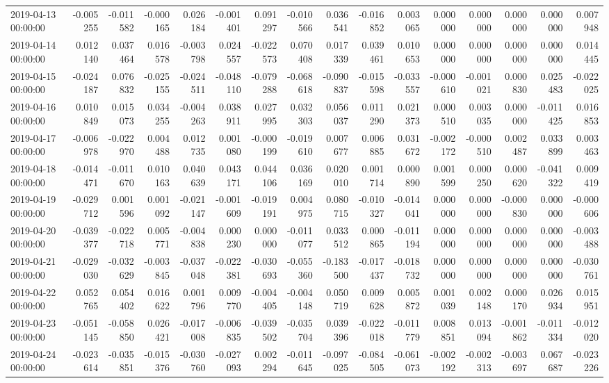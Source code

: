 \begin{tabular}{lrrrrrrrrrrrrrrr}
2019-04-13 00:00:00 & -0.005255 & -0.011582 & -0.000165 & 0.026184 & -0.001401 & 0.091297 & -0.010566 & 0.036541 & -0.016852 & 0.003065 & 0.000000 & 0.000000 & 0.000000 & 0.000000 & 0.007948 \\
2019-04-14 00:00:00 & 0.012140 & 0.037464 & 0.016578 & -0.003798 & 0.024557 & -0.022573 & 0.070408 & 0.017339 & 0.039461 & 0.010653 & 0.000000 & 0.000000 & 0.000000 & 0.000000 & 0.014445 \\
2019-04-15 00:00:00 & -0.024187 & 0.076832 & -0.025155 & -0.024511 & -0.048110 & -0.079288 & -0.068618 & -0.090837 & -0.015598 & -0.033557 & -0.000610 & -0.001021 & 0.000830 & 0.025483 & -0.022025 \\
2019-04-16 00:00:00 & 0.010849 & 0.015073 & 0.034255 & -0.004263 & 0.038911 & 0.027995 & 0.032303 & 0.056037 & 0.011290 & 0.021373 & 0.000510 & 0.003035 & 0.000000 & -0.011425 & 0.016853 \\
2019-04-17 00:00:00 & -0.006978 & -0.022970 & 0.004488 & 0.012735 & 0.001080 & -0.000199 & -0.019610 & 0.007677 & 0.006885 & 0.031672 & -0.002172 & -0.000510 & 0.002487 & 0.033899 & 0.003463 \\
2019-04-18 00:00:00 & -0.014471 & -0.011670 & 0.010163 & 0.040639 & 0.043171 & 0.044106 & 0.036169 & 0.020010 & 0.001714 & 0.000890 & 0.001599 & 0.000250 & 0.000620 & -0.041322 & 0.009419 \\
2019-04-19 00:00:00 & -0.029712 & 0.001596 & 0.001092 & -0.021147 & -0.001609 & -0.019191 & 0.004975 & 0.080715 & -0.010327 & -0.014041 & 0.000000 & 0.000000 & -0.000830 & 0.000000 & -0.000606 \\
2019-04-20 00:00:00 & -0.039377 & -0.022718 & 0.005771 & -0.004838 & 0.000230 & 0.000000 & -0.011077 & 0.033512 & 0.000865 & -0.011194 & 0.000000 & 0.000000 & 0.000000 & 0.000000 & -0.003488 \\
2019-04-21 00:00:00 & -0.029030 & -0.032629 & -0.003845 & -0.037048 & -0.022381 & -0.030693 & -0.055360 & -0.183500 & -0.017437 & -0.018732 & 0.000000 & 0.000000 & 0.000000 & 0.000000 & -0.030761 \\
2019-04-22 00:00:00 & 0.052765 & 0.054402 & 0.016622 & 0.001796 & 0.009770 & -0.004405 & -0.004148 & 0.050719 & 0.009628 & 0.005872 & 0.001039 & 0.002148 & 0.000170 & 0.026934 & 0.015951 \\
2019-04-23 00:00:00 & -0.051145 & -0.058850 & 0.026421 & -0.017008 & -0.006835 & -0.039502 & -0.035704 & 0.039396 & -0.022018 & -0.011779 & 0.008851 & 0.013094 & -0.001862 & -0.011334 & -0.012020 \\
2019-04-24 00:00:00 & -0.023614 & -0.035851 & -0.015376 & -0.030760 & -0.027093 & 0.002294 & -0.011645 & -0.097025 & -0.084505 & -0.061073 & -0.002192 & -0.002313 & -0.003697 & 0.067687 & -0.023226 \\

\end{tabular}
